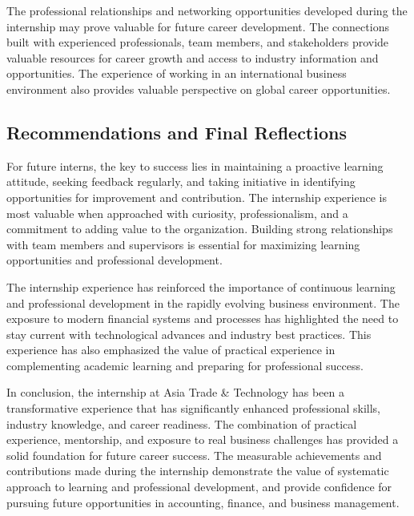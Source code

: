 The professional relationships and networking opportunities developed during the internship may prove valuable for future career development. The connections built with experienced professionals, team members, and stakeholders provide valuable resources for career growth and access to industry information and opportunities. The experience of working in an international business environment also provides valuable perspective on global career opportunities.

\vspace{0.3em}
\subsection{Recommendations and Final Reflections}
For future interns, the key to success lies in maintaining a proactive learning attitude, seeking feedback regularly, and taking initiative in identifying opportunities for improvement and contribution. The internship experience is most valuable when approached with curiosity, professionalism, and a commitment to adding value to the organization. Building strong relationships with team members and supervisors is essential for maximizing learning opportunities and professional development.

The internship experience has reinforced the importance of continuous learning and professional development in the rapidly evolving business environment. The exposure to modern financial systems and processes has highlighted the need to stay current with technological advances and industry best practices. This experience has also emphasized the value of practical experience in complementing academic learning and preparing for professional success.

In conclusion, the internship at Asia Trade \& Technology has been a transformative experience that has significantly enhanced professional skills, industry knowledge, and career readiness. The combination of practical experience, mentorship, and exposure to real business challenges has provided a solid foundation for future career success. The measurable achievements and contributions made during the internship demonstrate the value of systematic approach to learning and professional development, and provide confidence for pursuing future opportunities in accounting, finance, and business management.
